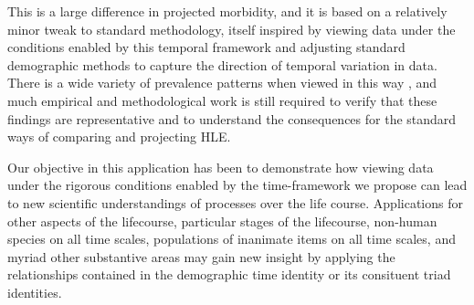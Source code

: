 \documentclass[12pt,oneside,a4paper]{article} %
\theoremstyle{definition}
\begin{document}
This is a large difference in projected morbidity, and it is based on a
relatively minor tweak to standard methodology, itself inspired by viewing data under the conditions
enabled by this temporal framework and adjusting standard demographic methods
to capture the direction of temporal variation in data. There is a wide variety
of prevalence patterns when viewed in this way \citep{riffe2015ttd,
wolf2015disability}, and much empirical and methodological work is still required to verify
that these findings are representative and to understand the consequences for
the standard ways of comparing and projecting HLE. 

Our objective in this application has been
to demonstrate how viewing data under the rigorous conditions enabled by the
time-framework we propose can lead to new scientific understandings of
processes over the life course. Applications for other aspects of the
lifecourse, particular stages of the lifecourse, non-human species on all time
scales, populations of inanimate items on all time scales, and myriad other
substantive areas may gain new insight by applying the relationships contained
in the demographic time identity or its consituent triad identities.




\end{document}
